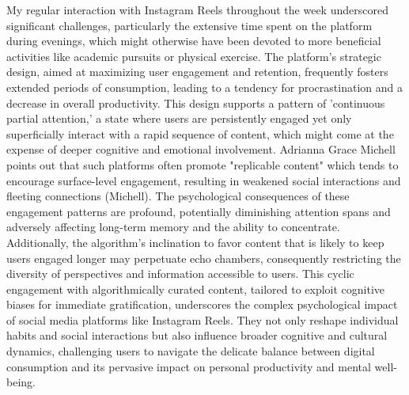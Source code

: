 \documentclass[12pt]{article}
\begin{document}
My regular interaction with Instagram Reels throughout the week underscored significant challenges, particularly the extensive time spent on the platform during evenings, which might otherwise have been devoted to more beneficial activities like academic pursuits or physical exercise. The platform's strategic design, aimed at maximizing user engagement and retention, frequently fosters extended periods of consumption, leading to a tendency for procrastination and a decrease in overall productivity. This design supports a pattern of 'continuous partial attention,' a state where users are persistently engaged yet only superficially interact with a rapid sequence of content, which might come at the expense of deeper cognitive and emotional involvement. Adrianna Grace Michell points out that such platforms often promote "replicable content" which tends to encourage surface-level engagement, resulting in weakened social interactions and fleeting connections (Michell). The psychological consequences of these engagement patterns are profound, potentially diminishing attention spans and adversely affecting long-term memory and the ability to concentrate. Additionally, the algorithm's inclination to favor content that is likely to keep users engaged longer may perpetuate echo chambers, consequently restricting the diversity of perspectives and information accessible to users. This cyclic engagement with algorithmically curated content, tailored to exploit cognitive biases for immediate gratification, underscores the complex psychological impact of social media platforms like Instagram Reels. They not only reshape individual habits and social interactions but also influence broader cognitive and cultural dynamics, challenging users to navigate the delicate balance between digital consumption and its pervasive impact on personal productivity and mental well-being.
\end{document}
